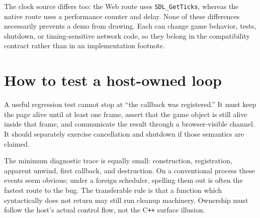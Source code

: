 The clock source differs too: the Web route uses \texttt{SDL\_GetTicks}, whereas the native
route uses a performance counter and delay.  None of these differences necessarily prevents
a demo from drawing.  Each can change game behavior, tests, shutdown, or timing-sensitive
network code, so they belong in the compatibility contract rather than in an implementation
footnote.

\section{How to test a host-owned loop}

A useful regression test cannot stop at ``the callback was registered.''  It must keep the
page alive until at least one frame, assert that the game object is still alive inside that
frame, and communicate the result through a browser-visible channel.  It should separately
exercise cancellation and shutdown if those semantics are claimed.

The minimum diagnostic trace is equally small: construction, registration, apparent unwind,
first callback, and destruction.  On a conventional process these events seem obvious; under
a foreign scheduler, spelling them out is often the fastest route to the bug.  The transferable
rule is that a function which syntactically does not return may still run cleanup machinery.
Ownership must follow the host's actual control flow, not the C\texttt{++} surface illusion.
